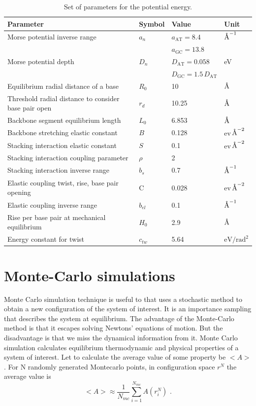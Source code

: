 \documentclass[12pt,masters,final]{UTRGVthesis}
\begin{document}
\begin{table} [ht!]
\centering  
\begin{tabular}{ | l | l | l | l |} 
    \hline
    Parameter & Symbol & Value & Unit \\ \hline
    Morse potential inverse range & $a_n$ & $a_{\text{AT}} = 8.4$ & $\text{\normalfont\AA}^{-1}$ \\
    & & $a_{\text{GC}} = 13.8$ & \\ \hline
    Morse potential depth & $D_n$ & $D_{\text{AT}} = 0.058$ & eV \\
    & & $D_{\text{GC}} = 1.5 \, D_{\text{AT}}$ & \\ \hline
    Equilibrium radial distance of a base & $R_0$ & 10 & $\text{\normalfont\AA}$ \\ \hline
    Threshold radial distance to consider base pair open & $r_d$ & 10.25 & $\text{\normalfont\AA}$ \\ \hline
    Backbone segment equilibrium length & $L_0$ & 6.853 & $\text{\normalfont\AA}$ \\ \hline
    Backbone stretching elastic constant & $B$ & 0.128 & ev\,$\text{\normalfont\AA}^{-2}$ \\ \hline
    Stacking interaction elastic constant & $S$ & 0.1 & ev\,$\text{\normalfont\AA}^{-2}$ \\ \hline
    Stacking interaction coupling parameter & $\rho$ & 2 &  \\ \hline
    Stacking interaction inverse range & $b_s$ & 0.7 & $\text{\normalfont\AA}^{-1}$ \\ \hline
    Elastic coupling twist, rise, base pair opening & C & 0.028
    & ev\,$\text{\normalfont\AA}^{-2}$ \\ \hline 
    Elastic coupling inverse range & $b_{el}$ & 0.1 & $\text{\normalfont\AA}^{-1}$ \\ \hline
    Rise per base pair at mechanical equilibrium & $H_0$ & 2.9 & $\text{\normalfont\AA}$ \\ \hline
    Energy constant for twist & $c_{tw}$ & 5.64 & $\text{eV}/{\text{rad}^2}$ \\ \hline
    \hline
    \end{tabular}
    \caption{Set of parameters for the potential energy.}
    \label{table_parameters}
    \end{table}
\newpage
%
\section{Monte-Carlo simulations}
Monte Carlo simulation technique is useful to that uses a stochastic method to obtain a new configuration of the system of interest. It is an importance sampling that describes the system at equilibrium. The advantage of the Monte-Carlo method is that it escapes solving Newtons' equations of motion. But the disadvantage is that we miss the dynamical information from it. Monte Carlo simulation calculates equilibrium thermodynamic and physical properties of a system of interest. Let to calculate the average value of some property be $<A>$. For N randomly generated Montecarlo points, in configuration space $r^{N}$ the average value is \begin{equation}
<A>\approx \frac{1}{N_{mc}}\sum\limits_{i=1}^{N_{mc}} A(r_{i}^{N})\,\, .\end{equation}
 
\end{document}
